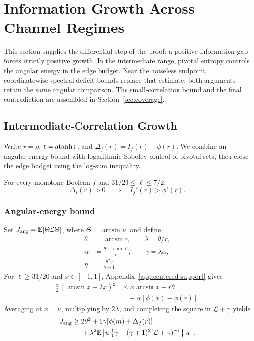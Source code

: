 \section{Information Growth Across Channel Regimes}
\label{sec:pivotal-middle}

This section supplies the differential step of the proof: a positive
information gap forces strictly positive growth. In the intermediate
range, pivotal entropy controls the angular energy in the edge budget.
Near the noiseless endpoint, coordinatewise spectral deficit bounds
replace that estimate; both arguments retain the same angular comparison.
The small-correlation bound and the final contradiction are assembled in
Section~\ref{sec:coverage}.

\subsection{Intermediate-Correlation Growth}

Write \(r=\rho\), \(\ell=\operatorname{atanh} r\), and
\(\Delta_f(r)=I_f(r)-\phi(r)\). We combine an angular-energy bound
with logarithmic Sobolev control of pivotal sets, then close the edge
budget using the log-sum inequality.

\begin{proposition}
\label{prop:middle-growth}
For every monotone Boolean \(f\) and \(31/20\le\ell\le7/2\),
\[
 \Delta_f(r)>0\quad\Longrightarrow\quad I_f'(r)>\phi'(r).
\]
\end{proposition}

\subsubsection{Angular-energy bound}

Set \(J_{\rm ang}=\mathbb E[\Theta\mathcal L\Theta]\), where \(\Theta=\arcsin u\),
and define
\begin{align*}
 \theta&=\arcsin r,\qquad \lambda=\theta/r,\\
 \alpha&=\frac{\theta+\sinh\ell}{\ell},\qquad
 \gamma=\lambda\alpha,\\
 \eta&=\frac{\theta^2\gamma}{\gamma+1}.
\end{align*}
For \(\ell\ge31/20\) and \(x\in[-1,1]\),
Appendix~\ref{app:centered-support} gives
\begin{equation}
 \begin{split}
 \frac{\alpha}{2}(\arcsin x-\lambda x)^2
 &\le x\arcsin x-r\theta\\
 &\quad-\alpha[\phi(x)-\phi(r)].
 \end{split}
 \label{eq:centered-support}
\end{equation}
Averaging at \(x=u\), multiplying by \(2\lambda\), and completing
the square in \(\mathcal L+\gamma\) yields
\begin{equation}
 \begin{split}
 J_{\rm ang}\ge{}&2\theta^2+2\gamma[\phi(m)+\Delta_f(r)]\\
 &+\lambda^2\mathbb E\left[u\left\{\gamma-
       (\gamma+1)^2(\mathcal L+\gamma)^{-1}\right\}u\right].
 \end{split}
 \label{eq:centered-resolvent}
\end{equation}

